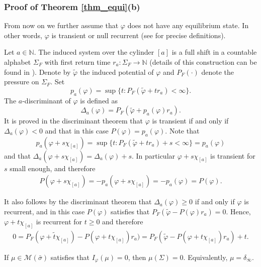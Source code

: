 \documentclass[letterpaper,11pt]{amsart}
\numberwithin{equation}{section}     %
\newcommand{\M}{\mathcal{M}}
\newcommand{\N}{\mathbb{N}}
\def\phi{\varphi}
\def\N{{\mathbb N}}
\def\M{{\mathcal M}}
\def\ge{\geqslant}
\def\M{\mathcal{M}}
\begin{document}
\subsubsection{Proof of Theorem \ref{thm_equi}(b)} From now on we further assume that $\phi$ does not have any equilibrium state. In other words, $\phi$ is transient or null recurrent (see \cite{sa1} for precise definitions). 

Let $a\in\N$. The induced system over the cylinder $[a]$ is a full shift in a countable alphabet $\Sigma_F$ with  first return time $r_a:\Sigma_F\to\N$ (details of this construction can be found in \cite{sa2}). Denote by $\tilde{\phi}$ the induced potential of $\phi$ and $P_F(\cdot)$ denote the pressure on $\Sigma_F$. Set $$p_a(\phi)=\sup\{t:P_F(\tilde{\phi}+t r_a)<\infty\}.$$ The $a$-discriminant of $\phi$ is defined as $$\Delta_a(\phi)=P_F(\tilde{\phi}+p_a(\phi)r_a).$$ It is proved in the discriminant theorem \cite[Theorem 2]{sa2} that $\phi$ is transient if and only if $\Delta_a(\phi)<0$ and that in this case $P(\phi)=p_a(\phi)$. Note that $$p_a(\phi+s\chi_{[a]})=\sup\{t:P_F(\tilde{\phi}+tr_a)+s<\infty\}=p_a(\phi)$$ and that $\Delta_a(\phi+s\chi_{[a]})=\Delta_a(\phi)+s$.  In particular $\phi+s\chi_{[a]}$ is transient for $s$ small enough, and therefore 
\begin{align}\label{eq:trans}
P(\phi+s\chi_{[a]})=-p_a(\phi+s\chi_{[a]})=-p_a(\phi)=P(\phi).
\end{align}

It also follows by the discriminant theorem that $\Delta_a(\phi)\ge 0$ if and only if $\phi$ is recurrent, and in this case $P(\phi)$ satisfies that $P_F(\tilde{\phi}-P(\phi) r_a)=0$. Hence,  $\phi+t\chi_{[a]}$ is recurrent for $t\ge 0$ and therefore  
\begin{align}\label{for:111}
    0=P_F(\widetilde{\phi+t\chi_{[a]}})-P(\phi+t\chi_{[a]})r_a)=P_F(\tilde{\phi}-P(\phi+t\chi_{[a]})r_a)+t.
\end{align}

\begin{lemma}\label{lem:=01}
If $\mu\in\M(\bar\sigma)$ satisfies that $I_\phi(\mu)=0$, then $\mu(\Sigma)=0$. Equivalently, $\mu=\delta_{\bar{\infty}}$.
\end{lemma}
\end{document}
